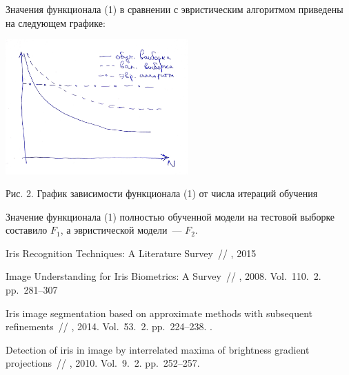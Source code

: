 \documentclass[12pt, twoside]{article}
\begin{document}
Значения функционала (1) в сравнении с эвристическим алгоритмом приведены на следующем графике:
\begin{center}
\includegraphics[width=7cm]{img/graph2.pdf}

Рис. 2. График зависимости функционала (1) от числа итераций обучения
\end{center}

Значение функционала (1) полностью обученной модели на тестовой выборке составило $F_1$, а эвристической модели~--- $F_2$.

\begin{thebibliography}{99}


   Iris Recognition Techniques: A Literature Survey~//
    , 2015

   Image Understanding for Iris Biometrics: A Survey~//
    , 2008. Vol.~110. \No\,2. pp.~281--307
	
   Iris image segmentation based on approximate methods
with subsequent refinements~//
    , 2014. Vol.~53. \No\,2. pp.~224--238.
	.
	
   Detection of iris in image by interrelated maxima of brightness gradient projections~//
    , 2010. Vol.~9. \No\,2. pp.~252--257.
	
 
 	
\end{thebibliography}

\end{document}
